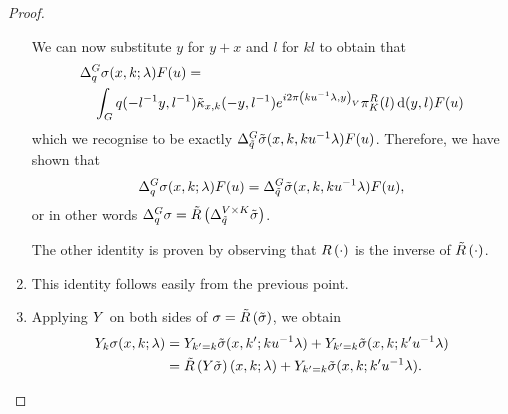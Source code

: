 \begin{proof}
\begin{enumerate}
            We can now substitute $y$ for $y + x$ and $l$ for $k l$ to obtain that
            \begin{align*}
                &\DifferenceOperator{q} \sigma(x, k; \lambda) F(u) =\\
                &\quad \int_\Group q(-l^{-1} y, l^{-1}) \tilde \kappa_{x, k}(-y, l^{-1}) \e^{\i \turn \ip {k u^{-1} \lambda} y} \RightRegularRepresentation(l) \dd (y, l) F(u)
            \end{align*}
            which we recognise to be exactly $\DifferenceOperator {\tilde q} \tilde \sigma(x, k, k u^{-1} \lambda) F(u)$.
            Therefore, we have shown that
            \begin{align*}
                \DifferenceOperator{q} \sigma(x, k; \lambda) F(u)
                = \DifferenceOperator {\tilde q} \tilde \sigma(x, k, k u^{-1} \lambda) F(u),
            \end{align*}
            or in other words $\DifferenceOperator q \sigma = \Rotation {\DifferenceOperator[\GroupDirect] {\tilde q} \tilde \sigma}$.

            The other identity is proven by observing that $\InverseRotation \dummy$ is the inverse of $\Rotation \dummy$.
        \item
            This identity follows easily from the previous point.
        \item
            Applying $\LeftDifferentialOperatorFirstOrder Y$ on both sides of $\sigma = \Rotation {\tilde \sigma}$,
            we obtain
            \begin{align}
                \LeftDifferentialOperatorFirstOrder Y_k \sigma(x, k; \lambda)
                &= \LeftDifferentialOperatorFirstOrder Y_{k' = k} \tilde \sigma(x, k'; k u^{-1} \lambda) + \LeftDifferentialOperatorFirstOrder Y_{k' = k} \tilde \sigma(x, k; k' u^{-1} \lambda)\\
                &= \Rotation {\LeftDifferentialOperatorFirstOrder Y \tilde \sigma}(x, k; \lambda) + \LeftDifferentialOperatorFirstOrder Y_{k' = k} \tilde \sigma(x, k; k' u^{-1} \lambda).
                \label{eq:Y_derivative_of_rotated_symbol_on_direct_product}
            \end{align}


\end{enumerate}
\end{proof}
